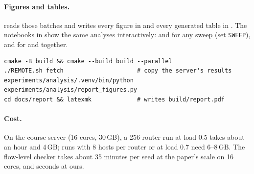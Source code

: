 \paragraph{Figures and tables.}  reads those batches and writes every figure in  and every generated table in . The notebooks in  show the same analyses interactively:  and  for any sweep (set \texttt{SWEEP}), and  for  and  together.

\begin{verbatim}
cmake -B build && cmake --build build --parallel
./REMOTE.sh fetch                     # copy the server's results
experiments/analysis/.venv/bin/python experiments/analysis/report_figures.py
cd docs/report && latexmk             # writes build/report.pdf
\end{verbatim}

\paragraph{Cost.} On the course server (16 cores, 30\,GB), a 256-router run at load 0.5 takes about an hour and 4\,GB; runs with 8 hosts per router or at load 0.7 need 6--8\,GB. The flow-level checker takes about 35 minutes per seed at the paper's scale on 16 cores, and seconds at ours.

